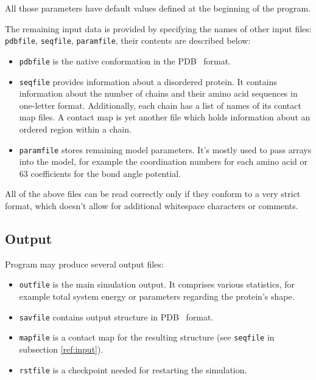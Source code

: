 All those parameters have default values defined at the beginning of the program. 


The remaining input data is provided by specifying the names of other input files: \texttt{pdbfile}, \texttt{seqfile}, \texttt{paramfile}, their contents are described below:

\begin{itemize}
\item \texttt{pdbfile} is the native conformation in the PDB~\cite{pdb} format.

\item \texttt{seqfile} provides information about a disordered protein. It contains information about the number of chains and their amino acid sequences in one-letter format. Additionally, each chain has a list of names of its contact map files. A contact map is yet another file which holds information about an ordered region within a chain. 

\item \texttt{paramfile} stores remaining model parameters. It's mostly used to pass arrays into the model, for example the coordination numbers for each amino acid or 63 coefficients for the bond angle potential.
\end{itemize}

All of the above files can be read correctly only if they conform to a very strict format, which doesn't allow for additional whitespace characters or comments.

\subsection{Output}
Program may produce several output files:

\begin{itemize}
\item \texttt{outfile} is the main simulation output. It comprises various statistics, for example total system energy or parameters regarding the protein's shape.

\item \texttt{savfile} contains output structure in PDB~\cite{pdb} format.

\item \texttt{mapfile} is a contact map for the resulting structure (see \texttt{seqfile} in subsection \ref{ref:input}).

\item \texttt{rstfile} is a checkpoint needed for restarting the simulation.

\end{itemize}

